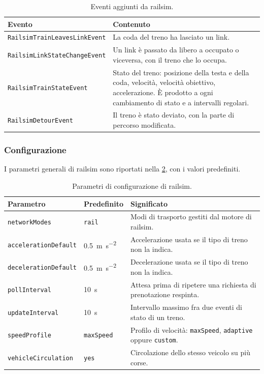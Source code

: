 \begin{table}[H]
	\centering
	\caption{Eventi aggiunti da railsim.}
	\label{tab:railsim-eventi}
	\begin{tabularx}{\textwidth}{lX}
		\toprule
		Evento & Contenuto \\
		\midrule
		\texttt{RailsimTrainLeavesLinkEvent} & La coda del treno ha lasciato un link. \\
		\texttt{RailsimLinkStateChangeEvent} & Un link è passato da libero a occupato o viceversa, con il treno che lo occupa. \\
		\texttt{RailsimTrainStateEvent} & Stato del treno: posizione della testa e della coda, velocità, velocità obiettivo, accelerazione. È prodotto a ogni cambiamento di stato e a intervalli regolari. \\
		\texttt{RailsimDetourEvent} & Il treno è stato deviato, con la parte di percorso modificata. \\
		\bottomrule
	\end{tabularx}
\end{table}

\subsubsection{Configurazione}
I parametri generali di railsim sono riportati nella \cref{tab:railsim-config}, con i valori predefiniti.

\begin{table}[H]
	\centering
	\caption{Parametri di configurazione di railsim.}
	\label{tab:railsim-config}
	\begin{tabularx}{\textwidth}{llX}
		\toprule
		Parametro & Predefinito & Significato \\
		\midrule
		\texttt{networkModes} & \texttt{rail} & Modi di trasporto gestiti dal motore di railsim. \\
		\texttt{accelerationDefault} & \SI{0,5}{\metre\per\second\squared} & Accelerazione usata se il tipo di treno non la indica. \\
		\texttt{decelerationDefault} & \SI{0,5}{\metre\per\second\squared} & Decelerazione usata se il tipo di treno non la indica. \\
		\texttt{pollInterval} & \SI{10}{\second} & Attesa prima di ripetere una richiesta di prenotazione respinta. \\
		\texttt{updateInterval} & \SI{10}{\second} & Intervallo massimo fra due eventi di stato di un treno. \\
		\texttt{speedProfile} & \texttt{maxSpeed} & Profilo di velocità: \texttt{maxSpeed}, \texttt{adaptive} oppure \texttt{custom}. \\
		\texttt{vehicleCirculation} & \texttt{yes} & Circolazione dello stesso veicolo su più corse. \\
		\bottomrule
	\end{tabularx}
\end{table}

